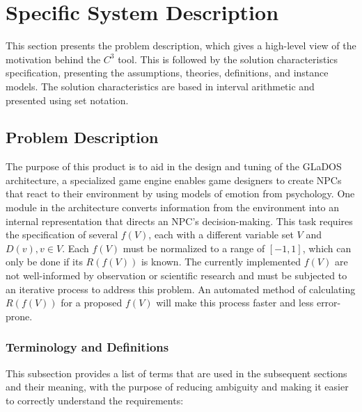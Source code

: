 \documentclass[12pt]{article}
\newcommand{\prognameAbbrv}{$C^{3}$}
\begin{document}
\section{Specific System Description}
\label{specific}
This section presents the problem description, which gives a high-level
view of the motivation behind the \prognameAbbrv{} tool. This is followed by 
the solution characteristics specification, presenting the assumptions, 
theories, definitions, and instance models. The solution characteristics are 
based in interval arithmetic and presented using set notation. 

\subsection{Problem Description} 
\label{Sec_pd}
The purpose of this product is to aid in the design and tuning of the GLaDOS 
architecture, a specialized game engine enables game designers to create NPCs 
that react to their environment by using models of emotion from psychology. One 
module in the architecture converts information from the environment into an 
internal representation that directs an NPC's decision-making. This task 
requires the specification of several $f(V)$, each with a different variable 
set $V$ and $D(v), v \in V$. Each $f(V)$ must be normalized to a range of 
$[-1,1]$, which can only be done if its $R(f(V))$ is known. The currently 
implemented $f(V)$ are not well-informed by observation or scientific research 
and must be subjected to an iterative process to address this problem. An 
automated method of calculating $R(f(V))$ for a proposed $f(V)$ will make this 
process faster and less error-prone.

\subsubsection{Terminology and  Definitions}

This subsection provides a list of terms that are used in the subsequent
sections and their meaning, with the purpose of reducing ambiguity and making it
easier to correctly understand the requirements:
\end{document}
